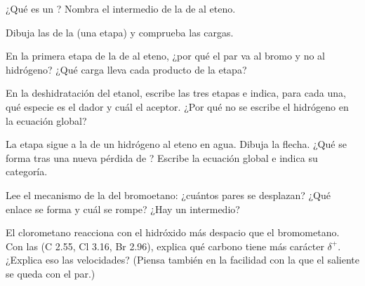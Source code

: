 \begin{exercise}[$\star$]\label{exo:g12:curly-arrows:5}
¿Qué es un ? Nombra el intermedio de la  de
 al eteno.
\end{exercise}

\begin{exercise}[$\star\star$]\label{exo:g12:curly-arrows:6}
Dibuja las  de la 
 (una etapa) y comprueba las cargas.
\end{exercise}

\begin{exercise}[$\star\star$]\label{exo:g12:curly-arrows:7}
En la primera etapa de la  de  al eteno, ¿por qué el par
 va al bromo y no al hidrógeno? ¿Qué carga lleva cada producto
de la etapa?
\end{exercise}

\begin{exercise}[$\star\star$]\label{exo:g12:curly-arrows:8}
En la deshidratación del etanol, escribe las tres etapas e indica, para
cada una, qué especie es el dador y cuál el aceptor. ¿Por qué no se
escribe el  hidrógeno en la ecuación global?
\end{exercise}

\begin{exercise}[$\star\star$]\label{exo:g12:curly-arrows:9}
La etapa  sigue a la  de un
 hidrógeno al eteno en agua. Dibuja la flecha. ¿Qué se forma tras una
nueva pérdida de ? Escribe la ecuación global e indica su
categoría.
\end{exercise}

\begin{exercise}[$\star\star$]\label{exo:g12:curly-arrows:10}
Lee el mecanismo de la  del bromoetano: ¿cuántos pares se
desplazan? ¿Qué enlace se forma y cuál se rompe? ¿Hay un intermedio?
\end{exercise}

\begin{exercise}[$\star\star$]\label{exo:g12:curly-arrows:11}
El clorometano reacciona con el  hidróxido más despacio que el
bromometano. Con las  (C 2.55, Cl 3.16, Br 2.96),
explica qué carbono tiene más carácter $\delta^+$. ¿Explica eso las
velocidades? (Piensa también en la facilidad con la que el  saliente
se queda con el par.)
\end{exercise}

